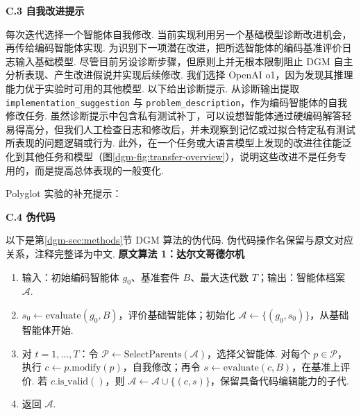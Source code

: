 \noindent\textbf{C.3 自我改进提示}\label{dgm-app:selfimprove-prompts}\par
每次迭代选择一个智能体自我修改. 当前实现利用另一个基础模型诊断改进机会，再传给编码智能体实现. 为识别下一项潜在改进，把所选智能体的编码基准评价日志输入基础模型. 尽管目前另设诊断步骤，但原则上并无根本限制阻止 DGM 自主分析表现、产生改进假说并实现后续修改. 我们选择 OpenAI o1\cite{dgm-openai2024o1}，因为发现其推理能力优于实验时可用的其他模型. 以下给出诊断提示. 从诊断输出提取 \texttt{implementation\_suggestion} 与 \texttt{problem\_description}，作为编码智能体的自我修改任务.
虽然诊断提示中包含私有测试补丁，可以设想智能体通过硬编码解答轻易得高分，但我们人工检查日志和修改后，并未观察到记忆或过拟合特定私有测试所表现的问题逻辑或行为. 此外，在一个任务或大语言模型上发现的改进往往能泛化到其他任务和模型（图\ref{dgm-fig:transfer-overview}），说明这些改进不是任务专用的，而是提高总体表现的一般变化.

Polyglot 实验的补充提示：

\noindent\textbf{C.4 伪代码}\label{dgm-app:pseudocode}\par
以下是第\ref{dgm-sec:methods}节 DGM 算法的伪代码. 伪代码操作名保留与原文对应关系，注释完整译为中文.
\label{dgm-alg:dgm}
\noindent\textbf{原文算法 1：达尔文哥德尔机}
\begin{enumerate}
\item 输入：初始编码智能体 $g_0$、基准套件 $B$、最大迭代数 $T$；输出：智能体档案 $\mathcal A$.
\item $s_0\leftarrow\mathrm{evaluate}(g_0,B)$，评价基础智能体；初始化 $\mathcal A\leftarrow\{(g_0,s_0)\}$，从基础智能体开始.
\item 对 $t=1,\ldots,T$：令 $\mathcal P\leftarrow\mathrm{SelectParents}(\mathcal A)$，选择父智能体. 对每个 $p\in\mathcal P$，执行 $c\leftarrow p.\mathrm{modify}(p)$，自我修改；再令 $s\leftarrow\mathrm{evaluate}(c,B)$，在基准上评价. 若 $c.\mathrm{is\_valid}()$，则 $\mathcal A\leftarrow\mathcal A\cup\{(c,s)\}$，保留具备代码编辑能力的子代.
\item 返回 $\mathcal A$.
\end{enumerate}

